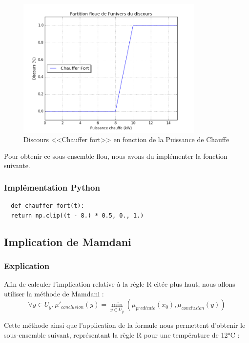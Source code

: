 \documentclass[a4paper]{article}
\begin{document}
\begin{figure}[h]
  \begin{center}
    \includegraphics[width=350px]{chauffer_fort.png}
  \end{center}
  \caption{Discours <<Chauffer fort>> en fonction de la Puissance de Chauffe}
\end{figure}

Pour obtenir ce sous-ensemble flou, nous avons du implémenter la fonction suivante.

\subsubsection{Implémentation Python}
\begin{lstlisting}
  def chauffer_fort(t):
  return np.clip((t - 8.) * 0.5, 0., 1.)
\end{lstlisting}

\clearpage
\subsection{Implication de Mamdani}

\subsubsection{Explication}
Afin de calculer l'implication relative à la règle R citée plus haut, nous allons utiliser la méthode de Mamdani :
\begin{equation}
  \forall y \in U_y, \mu'_{conclusion}(y) = \min_{y \in U_y} (\mu_{predicate}(x_0), \mu_{conclusion}(y))
\end{equation}

Cette méthode ainsi que l'application de la formule nous permettent d'obtenir le sous-ensemble suivant, représentant la règle R pour une température de 12°C :
\end{document}
